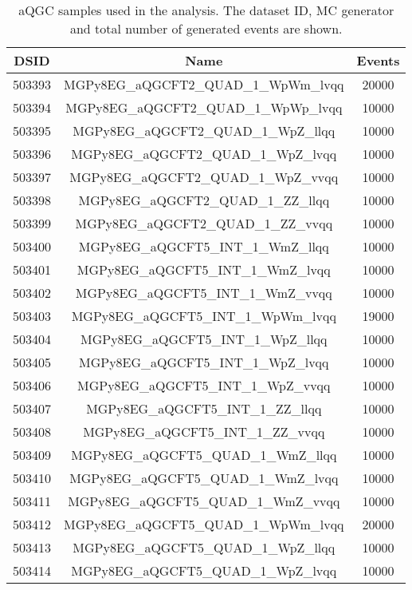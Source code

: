 \begin{table}[!htbp]
\begin{center}
\small
\caption{
aQGC samples used in the analysis. The dataset ID, MC generator and total number of generated events are shown.
}
\begin{tabular}{c|c|c}
\hline

\hline
DSID & Name & Events  \\
\hline

503393 & MGPy8EG\_aQGCFT2\_QUAD\_1\_WpWm\_lvqq   & 20000 \\
503394 & MGPy8EG\_aQGCFT2\_QUAD\_1\_WpWp\_lvqq   & 10000 \\
503395 & MGPy8EG\_aQGCFT2\_QUAD\_1\_WpZ\_llqq    & 10000 \\
503396 & MGPy8EG\_aQGCFT2\_QUAD\_1\_WpZ\_lvqq    & 10000 \\
503397 & MGPy8EG\_aQGCFT2\_QUAD\_1\_WpZ\_vvqq    & 10000 \\
503398 & MGPy8EG\_aQGCFT2\_QUAD\_1\_ZZ\_llqq     & 10000 \\
503399 & MGPy8EG\_aQGCFT2\_QUAD\_1\_ZZ\_vvqq     & 10000 \\
503400 & MGPy8EG\_aQGCFT5\_INT\_1\_WmZ\_llqq     & 10000 \\
503401 & MGPy8EG\_aQGCFT5\_INT\_1\_WmZ\_lvqq     & 10000 \\
503402 & MGPy8EG\_aQGCFT5\_INT\_1\_WmZ\_vvqq     & 10000 \\
503403 & MGPy8EG\_aQGCFT5\_INT\_1\_WpWm\_lvqq    & 19000 \\
503404 & MGPy8EG\_aQGCFT5\_INT\_1\_WpZ\_llqq     & 10000 \\
503405 & MGPy8EG\_aQGCFT5\_INT\_1\_WpZ\_lvqq     & 10000 \\
503406 & MGPy8EG\_aQGCFT5\_INT\_1\_WpZ\_vvqq     & 10000 \\
503407 & MGPy8EG\_aQGCFT5\_INT\_1\_ZZ\_llqq      & 10000 \\
503408 & MGPy8EG\_aQGCFT5\_INT\_1\_ZZ\_vvqq      & 10000 \\
503409 & MGPy8EG\_aQGCFT5\_QUAD\_1\_WmZ\_llqq    & 10000 \\
503410 & MGPy8EG\_aQGCFT5\_QUAD\_1\_WmZ\_lvqq    & 10000 \\
503411 & MGPy8EG\_aQGCFT5\_QUAD\_1\_WmZ\_vvqq    & 10000 \\
503412 & MGPy8EG\_aQGCFT5\_QUAD\_1\_WpWm\_lvqq   & 20000 \\
503413 & MGPy8EG\_aQGCFT5\_QUAD\_1\_WpZ\_llqq    & 10000 \\
503414 & MGPy8EG\_aQGCFT5\_QUAD\_1\_WpZ\_lvqq    & 10000 \\

\end{tabular}
\end{center}
\end{table}
